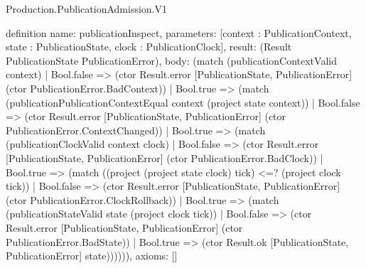\begin{lexlean}{Production.PublicationAdmission.V1}
\begin{semanticmodule}
definition{
  name: publicationInspect,
  parameters: [context : PublicationContext, state : PublicationState, clock : PublicationClock],
  result: (Result PublicationState PublicationError),
  body: (match (publicationContextValid context)
    | Bool.false => (ctor Result.error [PublicationState, PublicationError] (ctor PublicationError.BadContext))
    | Bool.true => (match (publicationPublicationContextEqual context (project state context))
      | Bool.false => (ctor Result.error [PublicationState, PublicationError] (ctor PublicationError.ContextChanged))
      | Bool.true => (match (publicationClockValid context clock)
        | Bool.false => (ctor Result.error [PublicationState, PublicationError] (ctor PublicationError.BadClock))
        | Bool.true => (match ((project (project state clock) tick) <=? (project clock tick))
          | Bool.false => (ctor Result.error [PublicationState, PublicationError] (ctor PublicationError.ClockRollback))
          | Bool.true => (match (publicationStateValid state (project clock tick))
            | Bool.false => (ctor Result.error [PublicationState, PublicationError] (ctor PublicationError.BadState))
            | Bool.true => (ctor Result.ok [PublicationState, PublicationError] state)))))),
  axioms: []
}


\end{semanticmodule}
\end{lexlean}
